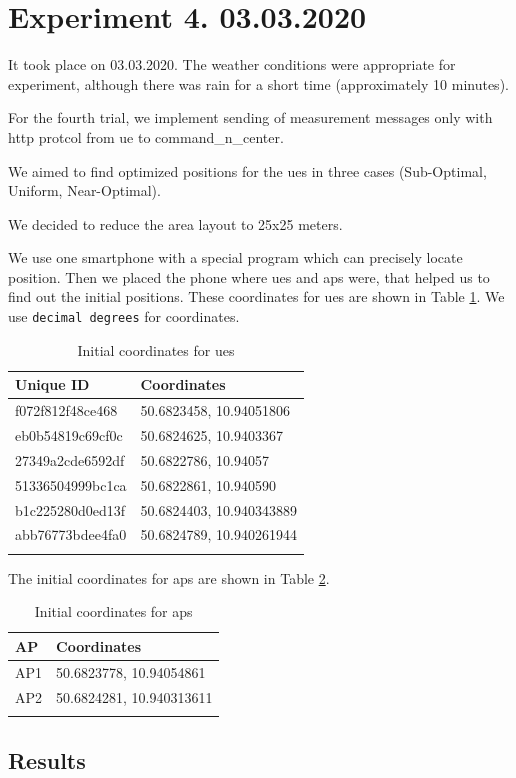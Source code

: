 \section{Experiment 4. 03.03.2020}\label{experiment-4.-03.03.2020}

It took place on 03.03.2020. The weather conditions were appropriate for experiment, although there was rain for a short time (approximately 10 minutes).

For the fourth trial, we implement sending of measurement messages only with \gls{http} protcol from \gls{ue} to \gls{command_n_center}. 

We aimed to find optimized positions for the \glspl{ue} in three cases (Sub-Optimal, Uniform, Near-Optimal).

We decided to reduce the area layout to 25x25 meters.

We use one smartphone with a special program which can precisely locate position. Then we placed the phone where \glspl{ue} and \glspl{ap} were, that helped us to find out the initial positions. These coordinates for \glspl{ue} are shown in Table \ref{tab:exp4-initial-coordinates-ues}. We use \texttt{decimal degrees} for coordinates.

\begin{longtable}[]{@{}ll@{}}
	\caption{Initial coordinates for \glspl{ue}}\tabularnewline
	\toprule
	Unique ID & Coordinates\tabularnewline
	\midrule
	\endhead
	f072f812f48ce468 & 50.6823458, 10.94051806\tabularnewline
	eb0b54819c69cf0c & 50.6824625, 10.9403367\tabularnewline
	27349a2cde6592df & 50.6822786, 10.94057\tabularnewline
	51336504999bc1ca & 50.6822861, 10.940590\tabularnewline
	b1c225280d0ed13f & 50.6824403, 10.940343889\tabularnewline
	abb76773bdee4fa0 & 50.6824789, 10.940261944\tabularnewline
	\label{tab:exp4-initial-coordinates-ues}
\end{longtable}


The initial coordinates for \glspl{ap} are shown in Table \ref{tab:exp4-initial-coordinates-aps}.

\begin{longtable}[]{@{}ll@{}}
	\caption{Initial coordinates for \glspl{ap} }\tabularnewline
	\toprule
	AP & Coordinates\tabularnewline
	\midrule
	\endhead
	AP1 & 50.6823778, 10.94054861\tabularnewline
	AP2 & 50.6824281, 10.940313611\tabularnewline
	\bottomrule
	\label{tab:exp4-initial-coordinates-aps}
\end{longtable}

\subsection{Results}

